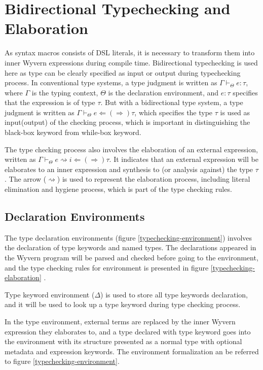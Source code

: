 \documentclass{sig-alternate}
\begin{document}
\section{Bidirectional Typechecking and Elaboration}
As syntax macros consists of DSL literals, it is necessary to transform them into inner Wyvern expressions during compile time. Bidirectional typechecking is used here as type can be clearly specified as input or output during typechecking process. In conventional type systems, a type judgment is written as $\Gamma\vdash_{\Theta} e:\tau$, where $\Gamma$ is the typing context, $\Theta$ is the declaration environment, and $e:\tau$ specifies that the expression is of type $\tau$. But with a bidirectional type system, a type judgment is written as $\Gamma\vdash_{\Theta} e\Leftarrow(\Rightarrow)\tau$, which specifies the type $\tau$ is used as input(output) of the checking process, which is important in distinguishing the black-box keyword from while-box keyword.
\par
The type checking process also involves the elaboration of an external expression, written as $\Gamma\vdash_{\Theta} e\rightsquigarrow i \Leftarrow(\Rightarrow) \tau$. It indicates that an external expression will be elaborates to an inner expression and synthesis to (or analysis against) the type $\tau$. The arrow ($\rightsquigarrow$) is used to represent the elaboration process, including literal elimination and hygiene process, which is part of the type checking rules.

\subsection{Declaration Environments}
The type declaration environments (figure \ref{typechecking-environment}) involves the declaration of type keywords and named types. The declarations appeared in the Wyvern program will be parsed and checked before going to the environment, and the type checking rules for environment is presented in figure \ref{typechecking-elaboration} . 

Type keyword environment ($\Delta$) is used to store all type keywords declaration, and it will be used to look up a type keyword during type checking process.

In the type environment, external terms are replaced by the inner Wyvern expression they elaborates to, and a type declared with type keyword goes into the environment with its structure presented as a normal type with optional metadata and expression keywords. The environment formalization an be referred to figure \ref{typechecking-environment}.
\end{document}
